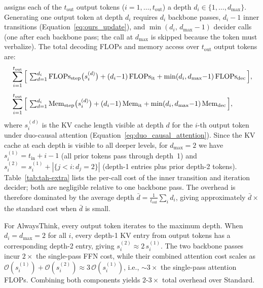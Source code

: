 \name assigns each of the $t_\text{out}$ output tokens ($i=1,\dots,t_\text{out}$) a depth $d_i\in\{1,\dots,d_\text{max}\}$.
Generating one output token at depth $d_i$ requires $d_i$ backbone passes, $d_i{-}1$ inner transitions (Equation~\ref{eq:ours_update}), and $\min(d_i,\,d_\text{max}{-}1)$ decider calls (one after each backbone pass; the call at $d_\text{max}$ is skipped because the token must verbalize).
The total decoding FLOPs and memory access over $t_\text{out}$ output tokens are:
\begin{align}
  &\sum_{i=1}^{t_\text{out}}\Big[\,
    \textstyle\sum_{d=1}^{d_i}\mathrm{FLOPs}_\text{step}\big(s_i^{(d)}\big)
    + (d_i{-}1)\,\mathrm{FLOPs}_\text{it}+\min(d_i,d_\text{max}{-}1)\,\mathrm{FLOPs}_\text{dec}
  \,\Big], \label{eq:tah-flops} \\[4pt]
  &\sum_{i=1}^{t_\text{out}}\Big[\,
    \textstyle\sum_{d=1}^{d_i}\mathrm{Mem}_\text{step}\big(s_i^{(d)}\big)
    + (d_i{-}1)\,\mathrm{Mem}_\text{it}+\min(d_i,d_\text{max}{-}1)\,\mathrm{Mem}_\text{dec}
  \,\Big], \label{eq:tah-mem}
\end{align}
where $s_i^{(d)}$ is the KV cache length visible at depth $d$ for the $i$-th output token under duo-causal attention (Equation~\ref{eq:duo_causal_attention}).
Since the KV cache at each depth is visible to all deeper levels, for $d_\text{max}{=}2$ we have
$s_i^{(1)} = t_\text{in} + i - 1$ (all prior tokens pass through depth~1) and
$s_i^{(2)} = s_i^{(1)} + |\{j < i : d_j {=} 2\}|$ (depth-1 entries plus prior depth-2 tokens).
Table~\ref{tab:tah-extra} lists the per-call cost of the inner transition and iteration decider; both are negligible relative to one backbone pass.
The overhead is therefore dominated by the average depth $\bar{d}=\frac{1}{t_\text{out}}\sum_i d_i$, giving approximately $\bar{d}\times$ the standard cost when $\bar{d}$ is small.

 For AlwaysThink, every output token iterates to the maximum depth. When $d_i{=}d_\text{max}{=}2$ for all $i$, every depth-1 KV entry from output tokens has a corresponding depth-2 entry, giving $s_i^{(2)} \approx 2\,s_i^{(1)}$.
The two backbone passes incur $2\times$ the single-pass FFN cost, while their combined attention cost scales as $\mathcal{O}(s_i^{(1)}) + \mathcal{O}(s_i^{(2)}) \approx 3\,\mathcal{O}(s_i^{(1)})$, i.e., ${\sim}3\times$ the single-pass attention FLOPs.
Combining both components yields $2$-$3\times$ total overhead over Standard.


